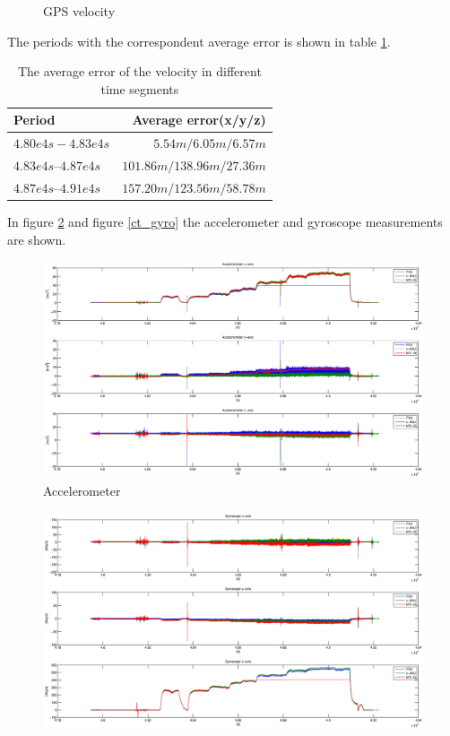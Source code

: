 \begin{description}
\begin{figure}[h]
\caption{GPS velocity}
\label{ct_vel}
\end{figure}
The periods with the correspondent average error is shown in table \ref{ct_vel_error}.
\begin{table}[h]
\centering
\begin{tabular}{|l|r|}
\hline
Period & Average error(x/y/z) \\
\hline
$4.80e4 s - 4.83e4 s$&$5.54 m / 6.05 m / 6.57 m$\\
\hline
$4.83e4 s – 4.87e4 s$&$101.86 m / 138.96 m/ 27.36 m$\\
\hline
$4.87e4s – 4.91e4 s$&$157.20 m / 123.56 m / 58.78 m$\\
\hline
\end{tabular}
\caption{The average error of the velocity in different time segments}
\label{ct_vel_error}
\end{table}
In figure \ref{ct_acc} and figure \ref{ct_gyro} the accelerometer and gyroscope measurements are shown. 
\begin{figure}[h]
\includegraphics[width=1.2\textwidth]{pictures/ct_acc.eps}
\caption{Accelerometer}
\label{ct_acc}
\end{figure}
\begin{figure}[h]
\includegraphics[width=1.2\textwidth]{pictures/ct_gyro.eps}

\end{figure}
\end{description}

